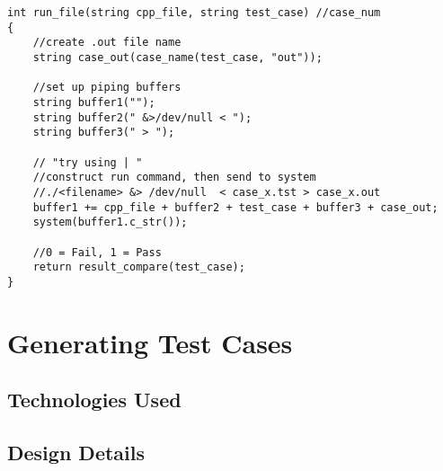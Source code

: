 \begin{lstlisting}
int run_file(string cpp_file, string test_case) //case_num
{
    //create .out file name
    string case_out(case_name(test_case, "out"));

    //set up piping buffers
    string buffer1("");
    string buffer2(" &>/dev/null < ");
    string buffer3(" > ");

    // "try using | "
    //construct run command, then send to system
    //./<filename> &> /dev/null  < case_x.tst > case_x.out
    buffer1 += cpp_file + buffer2 + test_case + buffer3 + case_out;
    system(buffer1.c_str());

    //0 = Fail, 1 = Pass
    return result_compare(test_case);
}
\end{lstlisting}

\section{Generating Test Cases}

\subsection{Technologies  Used}

\subsection{Design Details}

